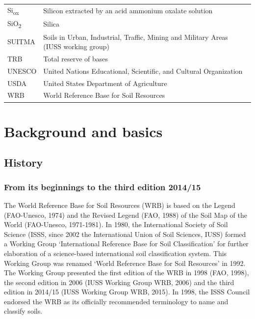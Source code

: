\documentclass[
  letterpaper,
  DIV=11,
  numbers=noendperiod]{scrreprt}
\begin{document}
\begin{longtable}[]{@{}
  >{\raggedright\arraybackslash}p{}
  >{\raggedright\arraybackslash}p{}@{}}
Si\textsubscript{ox} & Silicon extracted by an acid ammonium oxalate
solution \\
SiO\textsubscript{2} & Silica \\
SUITMA & Soils in Urban, Industrial, Traffic, Mining and Military Areas
(IUSS working group) \\
TRB & Total reserve of bases \\
UNESCO & United Nations Educational, Scientific, and Cultural
Organization \\
USDA & United States Department of Agriculture \\
WRB & World Reference Base for Soil Resources \\
\bottomrule()
\end{longtable}


\hypertarget{background-and-basics}{%
\chapter{Background and basics}\label{background-and-basics}}

\hypertarget{history}{%
\section{History}\label{history}}

\hypertarget{from-its-beginnings-to-the-third-edition-201415}{%
\subsection{From its beginnings to the third edition
2014/15}\label{from-its-beginnings-to-the-third-edition-201415}}

The World Reference Base for Soil Resources (WRB) is based on the Legend
(FAO-Unesco, 1974) and the Revised Legend (FAO, 1988) of the Soil Map of
the World (FAO-Unesco, 1971-1981). In 1980, the International Society of
Soil Science (ISSS, since 2002 the International Union of Soil Sciences,
IUSS) formed a Working Group `International Reference Base for Soil
Classification' for further elaboration of a science-based international
soil classification system. This Working Group was renamed `World
Reference Base for Soil Resources' in 1992. The Working Group presented
the first edition of the WRB in 1998 (FAO, 1998), the second edition in
2006 (IUSS Working Group WRB, 2006) and the third edition in 2014/15
(IUSS Working Group WRB, 2015). In 1998, the ISSS Council endorsed the
WRB as its officially recommended terminology to name and classify
soils.
\end{document}
